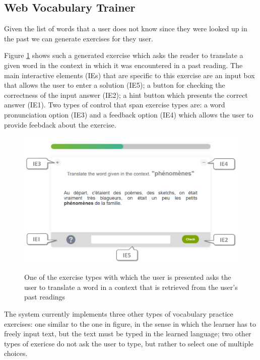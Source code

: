 
\newpage
\subsection{Web Vocabulary Trainer}

Given the list of words that a user does not know since they were looked  up in the past we can generate exercises for they user.

Figure \ref{exercise_translate} shows such a generated exercise which asks the reader to translate a given word in the context in which it was encountered in a past reading. The main interactive elements (IEs) that are specific to this exercise are an input box that allows the user to enter a solution (IE5); a button for checking the correctness of the input answer (IE2); a hint button which presents the correct answer (IE1). Two types of control that span exercise types are: a word pronunciation option (IE3) and a feedback option (IE4) which allows the user to provide feebdack about the exercise.

\begin{figure}[h!]
\centering
  \includegraphics[width=0.9\columnwidth]{figures/exercise_translate}
  \caption{One of the exercise types with which the user is presented asks the user to translate a word in a context that is retrieved from the user's past readings}{
  \label{exercise_translate}
  }
\end{figure}

The system currently implements three other types of vocabulary practice exercises: one similar to the one in figure, in the sense in which the learner has to freely input text, but the text must be typed in the learned language; two other types of exericse do not ask the user to type, but rather to select one of multiple choices. 

